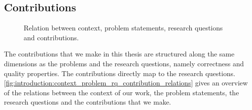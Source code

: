 

\subsection{Contributions}

\begin{figure}
    \centering
    
    \caption[Context, problems, research questions and contributions]{Relation between context, problem statements, research questions and contributions.}
    \label{fig:introduction:context_problem_rq_contribution_relations}
\end{figure}

The contributions that we make in this thesis are structured along the same dimensions as the problems and the research questions, namely correctness and quality properties.
The contributions directly map to the research questions.
\autoref{fig:introduction:context_problem_rq_contribution_relations} gives an overview of the relations between the context of our work, the problem statements, the research questions and the contributions that we make.


